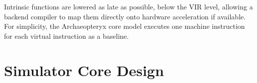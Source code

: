\documentclass[conference, 10pt]{IEEEtran}
\begin{document}
Intrinsic functions are lowered as late as possible, below the
VIR level, allowing a backend compiler to map them directly onto hardware
acceleration if available.  For simplicity, the Archaeopteryx core model
executes one machine instruction for each virtual instruction as a baseline.

%
%


\section{Simulator Core Design}
\label{sec:core-design}

\end{document}
